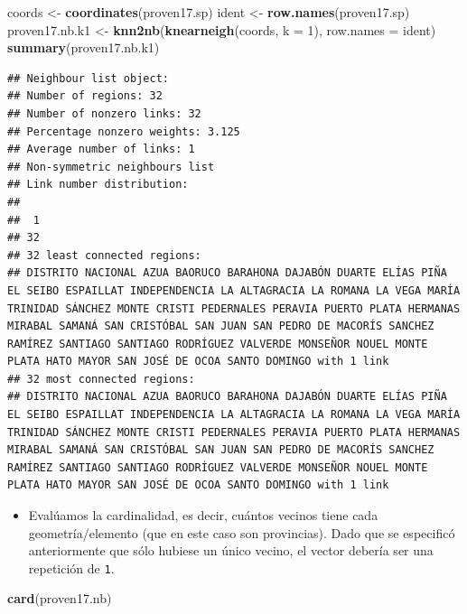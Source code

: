 \documentclass[11pt,]{article}
\newenvironment{Shaded}{\begin{snugshade}}{\end{snugshade}}
\newcommand{\KeywordTok}[1]{\textcolor[rgb]{0.13,0.29,0.53}{\textbf{#1}}}
\newcommand{\DataTypeTok}[1]{\textcolor[rgb]{0.13,0.29,0.53}{#1}}
\newcommand{\DecValTok}[1]{\textcolor[rgb]{0.00,0.00,0.81}{#1}}
\newcommand{\StringTok}[1]{\textcolor[rgb]{0.31,0.60,0.02}{#1}}
\newcommand{\NormalTok}[1]{#1}
\providecommand{\tightlist}{%
\setlength{\itemsep}{0pt}\setlength{\parskip}{0pt}}
\begin{document}
\begin{Shaded}
\begin{Highlighting}[]
\NormalTok{coords <-}\StringTok{ }\KeywordTok{coordinates}\NormalTok{(proven17.sp)}
\NormalTok{ident <-}\StringTok{ }\KeywordTok{row.names}\NormalTok{(proven17.sp)}
\NormalTok{proven17.nb.k1 <-}\StringTok{ }\KeywordTok{knn2nb}\NormalTok{(}\KeywordTok{knearneigh}\NormalTok{(coords, }\DataTypeTok{k =} \DecValTok{1}\NormalTok{), }\DataTypeTok{row.names =}\NormalTok{ ident)}
\KeywordTok{summary}\NormalTok{(proven17.nb.k1)}
\end{Highlighting}
\end{Shaded}

\begin{verbatim}
## Neighbour list object:
## Number of regions: 32 
## Number of nonzero links: 32 
## Percentage nonzero weights: 3.125 
## Average number of links: 1 
## Non-symmetric neighbours list
## Link number distribution:
## 
##  1 
## 32 
## 32 least connected regions:
## DISTRITO NACIONAL AZUA BAORUCO BARAHONA DAJABÓN DUARTE ELÍAS PIÑA EL SEIBO ESPAILLAT INDEPENDENCIA LA ALTAGRACIA LA ROMANA LA VEGA MARÍA TRINIDAD SÁNCHEZ MONTE CRISTI PEDERNALES PERAVIA PUERTO PLATA HERMANAS MIRABAL SAMANÁ SAN CRISTÓBAL SAN JUAN SAN PEDRO DE MACORÍS SANCHEZ RAMÍREZ SANTIAGO SANTIAGO RODRÍGUEZ VALVERDE MONSEÑOR NOUEL MONTE PLATA HATO MAYOR SAN JOSÉ DE OCOA SANTO DOMINGO with 1 link
## 32 most connected regions:
## DISTRITO NACIONAL AZUA BAORUCO BARAHONA DAJABÓN DUARTE ELÍAS PIÑA EL SEIBO ESPAILLAT INDEPENDENCIA LA ALTAGRACIA LA ROMANA LA VEGA MARÍA TRINIDAD SÁNCHEZ MONTE CRISTI PEDERNALES PERAVIA PUERTO PLATA HERMANAS MIRABAL SAMANÁ SAN CRISTÓBAL SAN JUAN SAN PEDRO DE MACORÍS SANCHEZ RAMÍREZ SANTIAGO SANTIAGO RODRÍGUEZ VALVERDE MONSEÑOR NOUEL MONTE PLATA HATO MAYOR SAN JOSÉ DE OCOA SANTO DOMINGO with 1 link
\end{verbatim}

\begin{itemize}
\tightlist
\item
  Evalúamos la cardinalidad, es decir, cuántos vecinos tiene cada
  geometría/elemento (que en este caso son provincias). Dado que se
  especificó anteriormente que sólo hubiese un único vecino, el vector
  debería ser una repetición de \texttt{1}.
\end{itemize}

\begin{Shaded}
\begin{Highlighting}[]
\KeywordTok{card}\NormalTok{(proven17.nb)}
\end{Highlighting}
\end{Shaded}
\end{document}
